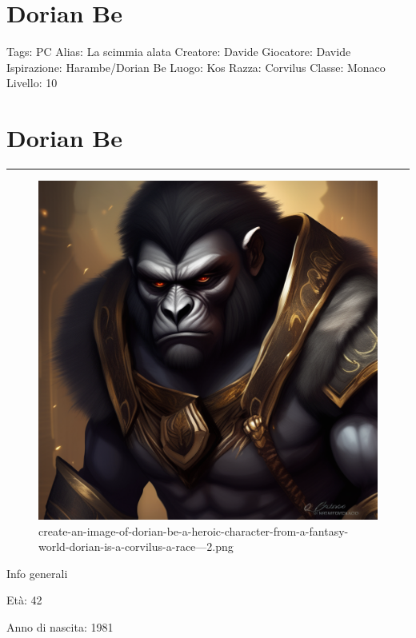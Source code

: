\section{Dorian Be}\label{dorian-be}

Tags: PC Alias: La scimmia alata Creatore: Davide Giocatore: Davide
Ispirazione: Harambe/Dorian Be Luogo: Kos Razza: Corvilus Classe: Monaco
Livello: 10

\section{Dorian Be}\label{dorian-be-1}

\begin{center}\rule{0.5\linewidth}{0.5pt}\end{center}

\begin{figure}
\centering
\includegraphics{create-an-image-of-dorian-be-a-heroic-character-from-a-fantasy-world-dorian-is-a-corvilus-a-race---2.png}
\caption{create-an-image-of-dorian-be-a-heroic-character-from-a-fantasy-world-dorian-is-a-corvilus-a-race---2.png}
\end{figure}

Info generali

Età: 42

Anno di nascita: 1981

